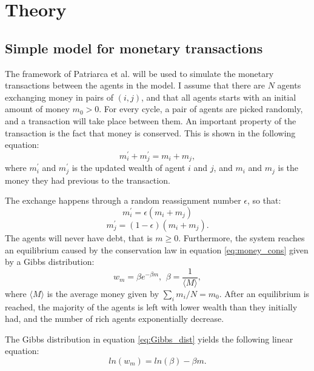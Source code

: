 \documentclass[11pt,a4paper,titlepage]{article}
\begin{document}
\section{Theory}
\subsection{Simple model for monetary transactions}
The framework of Patriarca et al. \cite{Patriarca} will be used to simulate the monetary transactions between the agents in the model. I assume that there are $N$ agents exchanging money in pairs of $(i,j)$, and that all agents starts with an initial amount of money $m_0 > 0$. For every cycle, a pair of agents are picked randomly, and a transaction will take place between them. An important property of the transaction is the fact that money is conserved. This is shown in the following equation:
\begin{equation}
\label{eq:money_cons}
m_{i}^{'} + m_{j}^{'} = m_{i}+m_{j},
\end{equation}
where $m_{i}^{'}$ and $m_{j}^{'}$ is the updated wealth of agent $i$ and $j$, and $m_{i}$ and $m_{j}$ is the money they had previous to the transaction. 

The exchange happens through a random reassignment number $\epsilon$, so that:
\begin{equation}
m_{i}^{'} = \epsilon(m_{i}+m_{j})
\end{equation}
\begin{equation}
m_{j}^{'} = (1-\epsilon)(m_{i}+m_{j}).
\end{equation}
The agents will never have debt, that is $m\geq0$. Furthermore, the system reaches an equilibrium caused by the conservation law in equation  \ref{eq:money_cons} given by a Gibbs distribution:
\begin{equation}
\label{eq:Gibbs_dist}
w_{m} = \beta e^{-\beta m}, \ \, \beta = \frac{1}{\langle M\rangle},
\end{equation}
where $\langle M\rangle$ is the average money given by $\sum_i m_i/N = m_0$. After an equilibrium is reached, the majority of the agents is left with lower wealth than they initially had, and the number of rich agents exponentially decrease. 

The Gibbs distribution in equation \ref{eq:Gibbs_dist} yields the following linear equation:
\begin{equation}
ln(w_m) = ln(\beta)-\beta m.
\end{equation}
\end{document}
